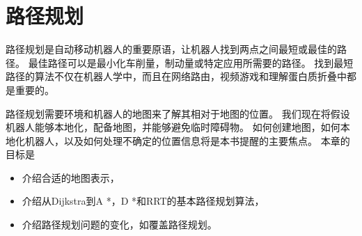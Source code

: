 \chapter{路径规划}
\label{chap:pathplanning}


路径规划是自动移动机器人的重要原语，让机器人找到两点之间最短或最佳的路径。 最佳路径可以是最小化车削量，制动量或特定应用所需要的路径。 找到最短路径的算法不仅在机器人学中，而且在网络路由，视频游戏和理解蛋白质折叠中都是重要的。

路径规划需要环境和机器人的地图来了解其相对于地图的位置。 我们现在将假设机器人能够本地化，配备地图，并能够避免临时障碍物。 如何创建地图，如何本地化机器人，以及如何处理不确定的位置信息将是本书提醒的主要焦点。 本章的目标是

\begin{itemize}

\item 介绍合适的地图表示，
\item 介绍从Dijkstra到A *，D *和RRT的基本路径规划算法，
\item 介绍路径规划问题的变化，如覆盖路径规划。
\end{itemize}

